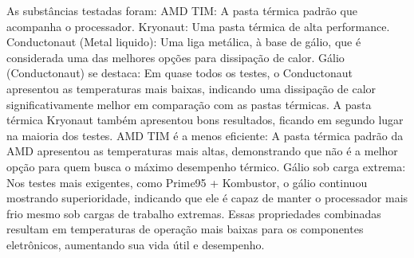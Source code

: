 \documentclass[12pt]{article}
\begin{document}
As substâncias testadas foram:
AMD TIM: A pasta térmica padrão que acompanha o processador.
Kryonaut: Uma pasta térmica de alta performance.
Conductonaut (Metal liquido): Uma liga metálica, à base de gálio, que é considerada uma das melhores opções para dissipação de calor.
Gálio (Conductonaut) se destaca: Em quase todos os testes, o Conductonaut apresentou as temperaturas mais baixas, indicando uma dissipação de calor significativamente melhor em comparação com as pastas térmicas.
A pasta térmica Kryonaut também apresentou bons resultados, ficando em segundo lugar na maioria dos testes.
AMD TIM é a menos eficiente: A pasta térmica padrão da AMD apresentou as temperaturas mais altas, demonstrando que não é a melhor opção para quem busca o máximo desempenho térmico.
Gálio sob carga extrema: Nos testes mais exigentes, como Prime95 + Kombustor, o gálio continuou mostrando superioridade, indicando que ele é capaz de manter o processador mais frio mesmo sob cargas de trabalho extremas.
Essas propriedades combinadas resultam em temperaturas de operação mais baixas para os componentes eletrônicos, aumentando sua vida útil e desempenho.
\end{document}
